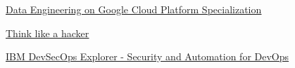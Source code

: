 %
%
%


\begin{coursework}
        {\href{https://www.coursera.org/account/accomplishments/specialization/certificate/3MKRH4BJ5MKQ}
        {\underline{Data Engineering on Google Cloud Platform Specialization}}}



        {\href{https://www.credly.com/badges/f2c1a7dc-86fe-473e-b5ec-018a981857f8}
        {\underline{Think like a hacker}}}

        {\href{https://www.credly.com/badges/c8708073-0350-4599-8285-fb6af65a12ea}
        {\underline{IBM DevSecOps Explorer - Security and Automation for DevOps}}}








\end{coursework}
